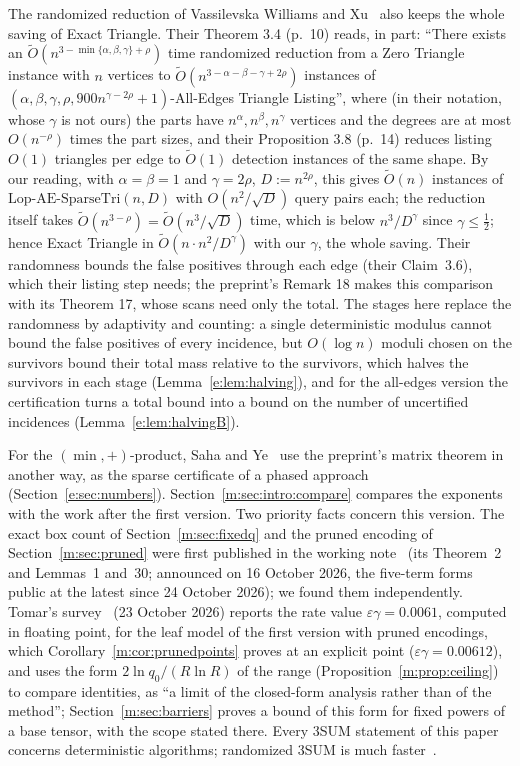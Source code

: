 \documentclass[11pt]{article}
\theoremstyle{definition}
\theoremstyle{remark}
\newcommand{\Lop}{\mathrm{Lop}\text{-}\allowbreak\mathrm{AE}\text{-}\allowbreak\mathrm{SparseTri}}
\newcommand{\EpsGammaBest}{0.00612}%
\begin{document}
The randomized reduction of Vassilevska Williams and Xu~\cite[Theorem~3.4 with Proposition~3.8]{VX20} also keeps the whole saving of Exact Triangle. Their Theorem 3.4 (p.~10) reads, in part: ``There exists an $\tilde O(n^{3-\min\{\alpha,\beta,\gamma\}+\rho})$ time randomized reduction from a Zero Triangle instance with $n$ vertices to $\tilde O(n^{3-\alpha-\beta-\gamma+2\rho})$ instances of $(\alpha,\beta,\gamma,\rho,900n^{\gamma-2\rho}+1)$-All-Edges Triangle Listing'', where (in their notation, whose $\gamma$ is not ours) the parts have $n^\alpha,n^\beta,n^\gamma$ vertices and the degrees are at most $O(n^{-\rho})$ times the part sizes, and their Proposition 3.8 (p.~14) reduces listing $O(1)$ triangles per edge to $\tilde O(1)$ detection instances of the same shape. By our reading, with $\alpha=\beta=1$ and $\gamma=2\rho$, $D:=n^{2\rho}$, this gives $\tilde O(n)$ instances of $\Lop(n,D)$ with $O(n^2/\sqrt D)$ query pairs each; the reduction itself takes $\tilde O(n^{3-\rho})=\tilde O(n^3/\sqrt D)$ time, which is below $n^3/D^\gamma$ since $\gamma\le\frac12$; hence Exact Triangle in $\tilde O(n\cdot n^2/D^{\gamma})$ with our $\gamma$, the whole saving. Their randomness bounds the false positives through each edge (their Claim~3.6), which their listing step needs; the preprint's Remark 18 makes this comparison with its Theorem 17, whose scans need only the total. The stages here replace the randomness by adaptivity and counting: a single deterministic modulus cannot bound the false positives of every incidence, but $O(\log n)$ moduli chosen on the survivors bound their total mass relative to the survivors, which halves the survivors in each stage (Lemma~\ref{e:lem:halving}), and for the all-edges version the certification turns a total bound into a bound on the number of uncertified incidences (Lemma~\ref{e:lem:halvingB}).

For the $(\min,+)$-product, Saha and Ye~\cite{SY26} use the preprint's matrix theorem in another way, as the sparse certificate of a phased approach (Section~\ref{e:sec:numbers}).
Section~\ref{m:sec:intro:compare} compares the exponents with the work after the first version. Two priority facts concern this version. The exact box count of Section~\ref{m:sec:fixedq} and the pruned encoding of Section~\ref{m:sec:pruned} were first published in the working note~\cite{Shr26} (its Theorem~2 and Lemmas~1 and~30; announced on 16 October 2026, the five-term forms public at the latest since 24 October 2026); we found them independently. Tomar's survey~\cite{Tom26} (23 October 2026) reports the rate value $\varepsilon\gamma=0.0061$, computed in floating point, for the leaf model of the first version with pruned encodings, which Corollary~\ref{m:cor:prunedpoints} proves at an explicit point ($\varepsilon\gamma=\EpsGammaBest$), and uses the form $2\ln q_0/(R\ln R)$ of the range (Proposition~\ref{m:prop:ceiling}) to compare identities, as ``a limit of the closed-form analysis rather than of the method''; Section~\ref{m:sec:barriers} proves a bound of this form for fixed powers of a base tensor, with the scope stated there. Every 3SUM statement of this paper concerns deterministic algorithms; randomized 3SUM is much faster~\cite{CIMY26}.
\end{document}
